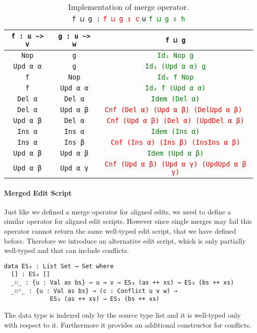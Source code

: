 \documentclass[preprint]{sigplanconf}
\begin{document}
	\begin{table*}[t]
	\centering
	\begin{tabular}{| c | c | c |}
	\hline
	\texttt{f : u \textasciitilde> v} & \texttt{g : u \textasciitilde> w} &  \texttt{f ⊔ g} 
	\\ \hline
	\texttt{Nop} & \texttt{g} & \textcolor{Green}{\texttt{Id₁ Nop g}} 
	\\ \hline
	\texttt{Upd α α} & \texttt{g} & \textcolor{Green}{\texttt{Id₁ (Upd α α) g}} 
	\\ \hline
	\texttt{f} & \texttt{Nop} & \textcolor{Green}{\texttt{Id₂ f Nop}} 
	\\ \hline
	\texttt{f} & \texttt{Upd α α} & \textcolor{Green}{\texttt{Id₂ f (Upd α α)}} 
	\\ \hline
	\texttt{Del α} & \texttt{Del α} & \textcolor{Green}{\texttt{Idem (Del α)}}
	\\ \hline
	\texttt{Del α} & \texttt{Upd α β} & \textcolor{Red}{\texttt{Cnf (Del α) (Upd α β) (DelUpd α β) }}
	\\ \hline
	\texttt{Upd α β} & \texttt{Del α} & \textcolor{Red}{\texttt{Cnf (Upd α β) (Del α) (UpdDel α β)}}
	\\ \hline
	\texttt{Ins α} & \texttt{Ins α} & \textcolor{Green}{\texttt{Idem (Ins α)}} 
	\\	\hline
	\texttt{Ins α} & \texttt{Ins β} & \textcolor{Red}{\texttt{Cnf (Ins α) (Ins β) (InsIns α β)}}
	\\	\hline
	\texttt{Upd α β} & \texttt{Upd α β} & \textcolor{Green}{\texttt{Idem (Upd α β)}}
	\\	\hline
	\texttt{Upd α β} & \texttt{Upd α γ} & \textcolor{Red}{\texttt{Cnf (Upd α β) (Upd α γ) (UpdUpd α β γ)}}
	\\ \hline
	\end{tabular}
	
	\captionsetup{singlelinecheck=false, justification=centering}

	\caption{Implementation of merge operator. \\
	 \texttt{f ⊔ g :} \textcolor{Red}{\texttt{f ⊔ g ↥ c}} \texttt{⊎} \textcolor{Green}{\texttt{f ⊔ g ↧ h}}}	 
	\label{table:merge}
	\end{table*}

	\paragraph{Merged Edit Script}
	Just like we defined a merge operator for aligned edits, we need to 
	define a similar operator for aligned edit scripts.
	However since single merges may fail this operator cannot return 
	the same well-typed edit script, that we have defined before.
	Therefore we introduce an alternative edit script, which is only partially 
	well-typed and that can include conflicts.
\begin{verbatim}
data ES₃ : List Set → Set where
  [] : ES₃ []
  _∷_ : {u : Val as bs} → u ⇝ v → ES₃ (as ++ xs) → ES₃ (bs ++ xs)
  _∷ᶜ_ : {u : Val as bs} → (c : Conflict u v w) → 
             ES₃ (as ++ xs) → ES₃ (bs ++ xs)
\end{verbatim}
	The data type is indexed only by the source type list and it is well-typed
	only with respect to it. Furthermore it provides an additional constructor
	for conflicts. 
\end{document}

